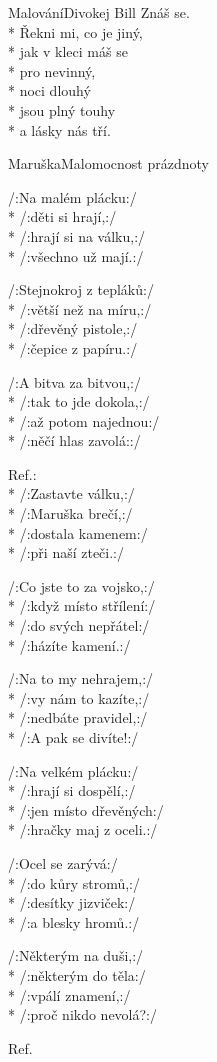 \documentclass[10.5pt]{book}
\begin{document}
\begin{poem}{Malování}{Divokej Bill}
Znáš se.\\*
Řekni mi, co je jiný,\\*
jak v kleci máš se\\*
pro nevinný,\\*
noci dlouhý\\*
jsou plný touhy\\*
a lásky nás tří.

\end{poem}

\begin{poem}{Maruška}{Malomocnost prázdnoty}

\settowidth{\versewidth}{Co jste to za vojsko,}

/:Na malém plácku:/\\*
/:děti si hrají,:/\\*
/:hrají si na válku,:/\\*
/:všechno už mají.:/

/:Stejnokroj z tepláků:/\\*
/:větší než na míru,:/\\*
/:dřevěný pistole,:/\\*
/:čepice z papíru.:/

/:A bitva za bitvou,:/\\*
/:tak to jde dokola,:/\\*
/:až potom najednou:/\\*
/:něčí hlas zavolá::/

Ref.:\\*
/:Zastavte válku,:/\\*
/:Maruška brečí,:/\\*
/:dostala kamenem:/\\*
/:při naší zteči.:/

/:Co jste to za vojsko,:/\\*
/:když místo střílení:/\\*
/:do svých nepřátel:/\\*
/:házíte kamení.:/

/:Na to my nehrajem,:/\\*
/:vy nám to kazíte,:/\\*
/:nedbáte pravidel,:/\\*
/:A pak se divíte!:/

/:Na velkém plácku:/\\*
/:hrají si dospělí,:/\\*
/:jen místo dřevěných:/\\*
/:hračky maj z oceli.:/

/:Ocel se zarývá:/\\*
/:do kůry stromů,:/\\*
/:desítky jizviček:/\\*
/:a blesky hromů.:/

/:Některým na duši,:/\\*
/:některým do těla:/\\*
/:vpálí znamení,:/\\*
/:proč nikdo nevolá?:/

Ref.

\end{poem}
\end{document}
